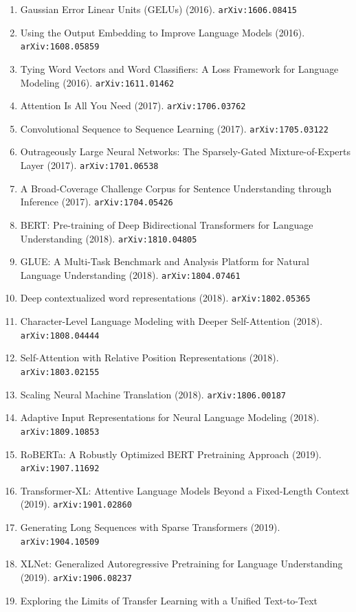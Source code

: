 \documentclass[11pt]{article}
\begin{document}
\begin{enumerate}
  \item Gaussian Error Linear Units (GELUs) (2016). \texttt{arXiv:1606.08415}
  \item Using the Output Embedding to Improve Language Models (2016). \texttt{arXiv:1608.05859}
  \item Tying Word Vectors and Word Classifiers: A Loss Framework for Language
  Modeling (2016). \texttt{arXiv:1611.01462}
  \item Attention Is All You Need (2017). \texttt{arXiv:1706.03762}
  \item Convolutional Sequence to Sequence Learning (2017). \texttt{arXiv:1705.03122}
  \item Outrageously Large Neural Networks: The Sparsely-Gated
  Mixture-of-Experts Layer (2017). \texttt{arXiv:1701.06538}
  \item A Broad-Coverage Challenge Corpus for Sentence Understanding through
  Inference (2017). \texttt{arXiv:1704.05426}
  \item BERT: Pre-training of Deep Bidirectional Transformers for Language
  Understanding (2018). \texttt{arXiv:1810.04805}
  \item GLUE: A Multi-Task Benchmark and Analysis Platform for Natural Language
  Understanding (2018). \texttt{arXiv:1804.07461}
  \item Deep contextualized word representations (2018). \texttt{arXiv:1802.05365}
  \item Character-Level Language Modeling with Deeper Self-Attention (2018). \texttt{arXiv:1808.04444}
  \item Self-Attention with Relative Position Representations (2018). \texttt{arXiv:1803.02155}
  \item Scaling Neural Machine Translation (2018). \texttt{arXiv:1806.00187}
  \item Adaptive Input Representations for Neural Language Modeling (2018). \texttt{arXiv:1809.10853}
  \item RoBERTa: A Robustly Optimized BERT Pretraining Approach (2019). \texttt{arXiv:1907.11692}
  \item Transformer-XL: Attentive Language Models Beyond a Fixed-Length Context (2019). \texttt{arXiv:1901.02860}
  \item Generating Long Sequences with Sparse Transformers (2019). \texttt{arXiv:1904.10509}
  \item XLNet: Generalized Autoregressive Pretraining for Language Understanding (2019). \texttt{arXiv:1906.08237}
  \item Exploring the Limits of Transfer Learning with a Unified Text-to-Text

\end{enumerate}
\end{document}
